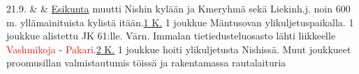 \documentclass[11pt,a5paper,oneside]{book}
\begin{document}
21.9. & & \underline{Esikunta} muutti Nishin kylään ja Kmeryhmä sekä Liekinh.j. noin 600 m. yllämainituista kylistä itään.\newline\newline \underline{1 K.} 1 joukkue Mäntusovan ylikuljetuspaikalla. 1 joukkue alistettu JK 61:lle. Värn. Immalan tietiedusteluosasto lähti liikkeelle \textcolor{red}{Vashmikoja} - \textcolor{red}{Pakari}.\newline\newline \underline{2 K.} 1 joukkue hoiti ylikuljetusta Nishissä. Muut joukkueet proomusillan valmistautumis töissä ja rakentamassa rautalaituria \\

\taulustop

\end{document}
